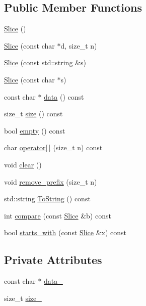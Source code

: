 \subsection*{Public Member Functions}
\begin{DoxyCompactItemize}
\item 
\hyperlink{classleveldb_1_1_slice_a5a57e9733fb783aceec1aecfe068ad85}{Slice} ()
\item 
\hyperlink{classleveldb_1_1_slice_ae77bd1d4353bd94d768474d467657c85}{Slice} (const char $\ast$d, size\+\_\+t n)
\item 
\hyperlink{classleveldb_1_1_slice_ab79b60f33aa094179fe36880bc220853}{Slice} (const std\+::string \&s)
\item 
\hyperlink{classleveldb_1_1_slice_a429c530560405fe1a7cd745f7afecf5a}{Slice} (const char $\ast$s)
\item 
const char $\ast$ \hyperlink{classleveldb_1_1_slice_aa64861043d9deee6889461bf0593cf73}{data} () const 
\item 
size\+\_\+t \hyperlink{classleveldb_1_1_slice_a947d3173f04f8a30553e89046daf91d5}{size} () const 
\item 
bool \hyperlink{classleveldb_1_1_slice_a7d0b93d5801bff5656068647759dcb8f}{empty} () const 
\item 
char \hyperlink{classleveldb_1_1_slice_aee7728645cecb259e9804b3b058a40dd}{operator\mbox{[}$\,$\mbox{]}} (size\+\_\+t n) const 
\item 
void \hyperlink{classleveldb_1_1_slice_ab9b6e340e8a483a5cf713f6be17709e3}{clear} ()
\item 
void \hyperlink{classleveldb_1_1_slice_a1be5b22958a115ebecb2b017aad2b3f6}{remove\+\_\+prefix} (size\+\_\+t n)
\item 
std\+::string \hyperlink{classleveldb_1_1_slice_a2cdd9fb649105033fde510afc9416732}{To\+String} () const 
\item 
int \hyperlink{classleveldb_1_1_slice_add751a5852d57a6d0697c85c1e0f3c94}{compare} (const \hyperlink{classleveldb_1_1_slice}{Slice} \&b) const 
\item 
bool \hyperlink{classleveldb_1_1_slice_aac9a3ee9b05567c8c93793e7593a5f13}{starts\+\_\+with} (const \hyperlink{classleveldb_1_1_slice}{Slice} \&x) const 
\end{DoxyCompactItemize}
\subsection*{Private Attributes}
\begin{DoxyCompactItemize}
\item 
const char $\ast$ \hyperlink{classleveldb_1_1_slice_a5c5f7e46f1dfaf661d6888a5460e8aa8}{data\+\_\+}
\item 
size\+\_\+t \hyperlink{classleveldb_1_1_slice_a5df3db41919d1700c5e8d95f0e40d1ca}{size\+\_\+}
\end{DoxyCompactItemize}


